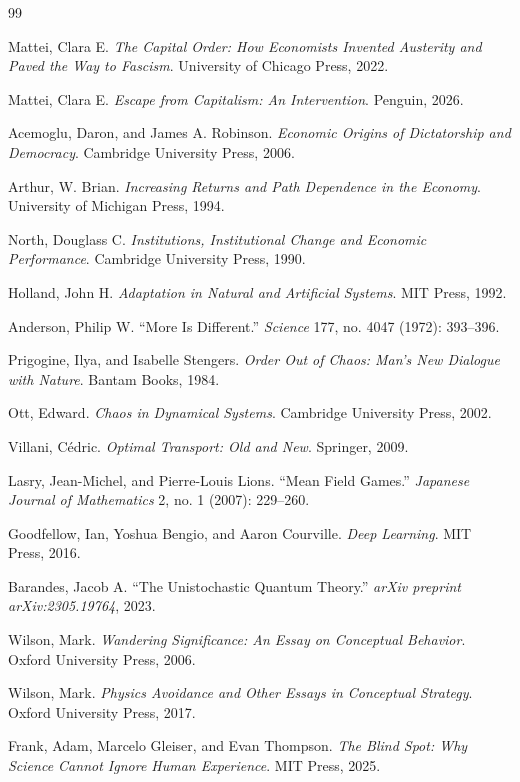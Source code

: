 \documentclass[11pt, a4paper]{article}
\begin{document}
\begin{thebibliography}{99}

Mattei, Clara E.
\textit{The Capital Order: How Economists Invented Austerity and Paved the Way to Fascism}.
University of Chicago Press, 2022.

Mattei, Clara E.
\textit{Escape from Capitalism: An Intervention}.
Penguin, 2026.

Acemoglu, Daron, and James A. Robinson.
\textit{Economic Origins of Dictatorship and Democracy}.
Cambridge University Press, 2006.

Arthur, W. Brian.
\textit{Increasing Returns and Path Dependence in the Economy}.
University of Michigan Press, 1994.

North, Douglass C.
\textit{Institutions, Institutional Change and Economic Performance}.
Cambridge University Press, 1990.

Holland, John H.
\textit{Adaptation in Natural and Artificial Systems}.
MIT Press, 1992.

Anderson, Philip W.
``More Is Different.''
\textit{Science} 177, no. 4047 (1972): 393--396.

Prigogine, Ilya, and Isabelle Stengers.
\textit{Order Out of Chaos: Man's New Dialogue with Nature}.
Bantam Books, 1984.

Ott, Edward.
\textit{Chaos in Dynamical Systems}.
Cambridge University Press, 2002.

Villani, C\'{e}dric.
\textit{Optimal Transport: Old and New}.
Springer, 2009.

Lasry, Jean-Michel, and Pierre-Louis Lions.
``Mean Field Games.''
\textit{Japanese Journal of Mathematics} 2, no. 1 (2007): 229--260.

Goodfellow, Ian, Yoshua Bengio, and Aaron Courville.
\textit{Deep Learning}.
MIT Press, 2016.

Barandes, Jacob A.
``The Unistochastic Quantum Theory.''
\textit{arXiv preprint arXiv:2305.19764}, 2023.

Wilson, Mark.
\textit{Wandering Significance: An Essay on Conceptual Behavior}.
Oxford University Press, 2006.

Wilson, Mark.
\textit{Physics Avoidance and Other Essays in Conceptual Strategy}.
Oxford University Press, 2017.

Frank, Adam, Marcelo Gleiser, and Evan Thompson.
\textit{The Blind Spot: Why Science Cannot Ignore Human Experience}.
MIT Press, 2025.

\end{thebibliography}
\end{document}
